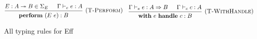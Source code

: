 \documentclass[class=article, crop=false]{standalone}
\newcommand{\effWith}{\mathbf{with}\ }
\newcommand{\effHandle}{\ \mathbf{handle}\ }
\newcommand{\effPerform}{\mathbf{perform}\ }
\newcommand{\tto}{\twoheadrightarrow}
\newcommand{\handlerType}{\Rightarrow}
\begin{document}
\begin{figure}[H]
    $$
    \begin{prooftree}
      \hypo{E : A \tto B \in \Sigma_E}
      \hypo{\Gamma \vdash_e e : A}
      \infer2[(\textsc{T-Perform})]{\effPerform (E\ e) : B}
    \end{prooftree}
    \quad
    \begin{prooftree}
      \hypo{\Gamma \vdash_e e : A \handlerType B}
      \hypo{\Gamma \vdash_c c : A}
      \infer2[(\textsc{T-WithHandle})]{\effWith e \effHandle c : B}
    \end{prooftree}
    $$
    
    \caption{All typing rules for Eff}
    \label{fig:full-type-checking}
  \end{figure}
\end{document}
